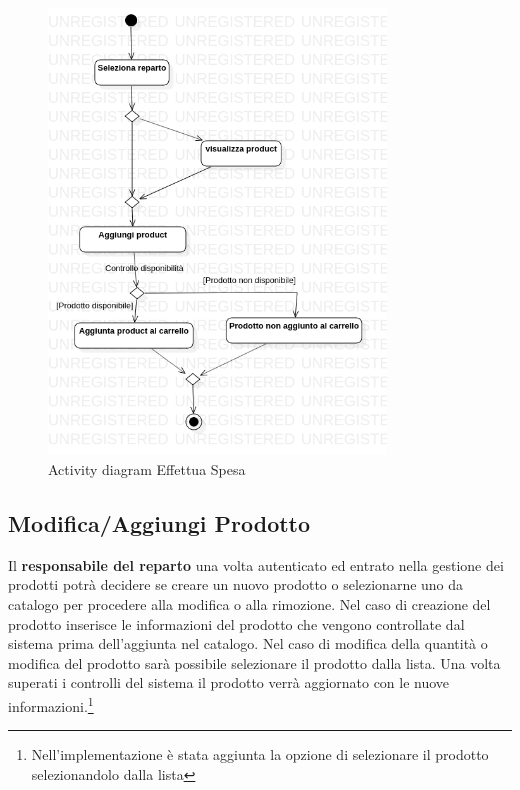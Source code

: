 \documentclass[12pt, a4paper]{report}
\begin{document}
\begin{figure}[h]
  \centering
  \includegraphics[width=0.8\textwidth]{Use Case Model!Effettua spesa!ActivityeffettuaSpesa!ActivityDiagramEffettuaSpesa_4.png}
  \caption{Activity diagram Effettua Spesa}
\end{figure}

\newpage

\subsection{Modifica/Aggiungi Prodotto}

Il \textbf{responsabile del reparto } una volta autenticato ed entrato nella
gestione dei prodotti potrà decidere se creare un nuovo prodotto o selezionarne
uno da catalogo per procedere alla modifica o alla rimozione. Nel caso di
creazione del prodotto inserisce le informazioni del prodotto che vengono
controllate dal sistema prima dell'aggiunta nel catalogo. Nel caso di modifica
della quantità o modifica del prodotto sarà possibile selezionare il prodotto
dalla lista. Una volta superati i controlli del sistema il prodotto verrà
aggiornato con le nuove informazioni.\footnote{Nell'implementazione è stata
aggiunta la opzione di selezionare il prodotto selezionandolo dalla lista}
\end{document}

